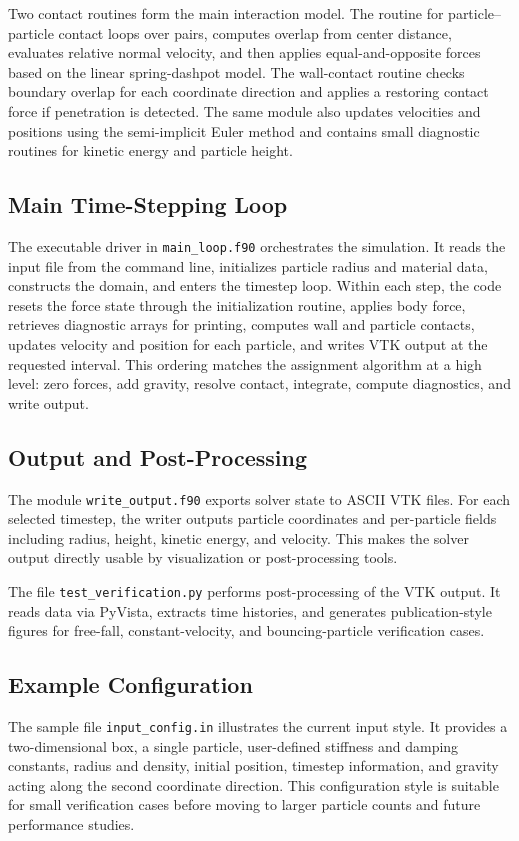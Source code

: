 \documentclass[conference]{IEEEtran}
\begin{document}
Two contact routines form the main interaction model. The routine for particle--particle contact loops over pairs, computes overlap from center distance, evaluates relative normal velocity, and then applies equal-and-opposite forces based on the linear spring-dashpot model. The wall-contact routine checks boundary overlap for each coordinate direction and applies a restoring contact force if penetration is detected. The same module also updates velocities and positions using the semi-implicit Euler method and contains small diagnostic routines for kinetic energy and particle height.

\subsection{Main Time-Stepping Loop}
The executable driver in \texttt{main\_loop.f90} orchestrates the simulation. It reads the input file from the command line, initializes particle radius and material data, constructs the domain, and enters the timestep loop. Within each step, the code resets the force state through the initialization routine, applies body force, retrieves diagnostic arrays for printing, computes wall and particle contacts, updates velocity and position for each particle, and writes VTK output at the requested interval. This ordering matches the assignment algorithm at a high level: zero forces, add gravity, resolve contact, integrate, compute diagnostics, and write output.

\subsection{Output and Post-Processing}
The module \texttt{write\_output.f90} exports solver state to ASCII VTK files. For each selected timestep, the writer outputs particle coordinates and per-particle fields including radius, height, kinetic energy, and velocity. This makes the solver output directly usable by visualization or post-processing tools.

The file \texttt{test\_verification.py} performs post-processing of the VTK output. It reads data via PyVista, extracts time histories, and generates publication-style figures for free-fall, constant-velocity, and bouncing-particle verification cases.

\subsection{Example Configuration}
The sample file \texttt{input\_config.in} illustrates the current input style. It provides a two-dimensional box, a single particle, user-defined stiffness and damping constants, radius and density, initial position, timestep information, and gravity acting along the second coordinate direction. This configuration style is suitable for small verification cases before moving to larger particle counts and future performance studies.
\end{document}

